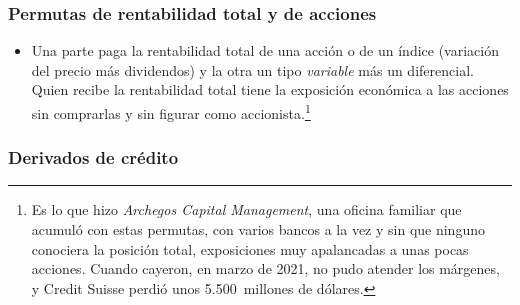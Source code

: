 \documentclass[11pt]{article}
\begin{document}
\subsubsection{Permutas de rentabilidad total y de acciones}\label{sec:equity-swaps}

\begin{itemize}
\item Una parte paga la rentabilidad total de una acción o de un índice (variación del precio más dividendos) y la otra un tipo \emph{variable} más un diferencial. Quien recibe la rentabilidad total tiene la exposición económica a las acciones sin comprarlas y sin figurar como accionista.\footnote{Es lo que hizo \emph{Archegos Capital Management}, una oficina familiar que acumuló con estas permutas, con varios bancos a la vez y sin que ninguno conociera la posición total, exposiciones muy apalancadas a unas pocas acciones. Cuando cayeron, en marzo de 2021, no pudo atender los márgenes, y Credit Suisse perdió unos 5.500~millones de dólares\nocite{PaulWeiss2021Archegos}.}
\end{itemize}

\subsubsection{Derivados de crédito}\label{sec:cds}
\end{document}

